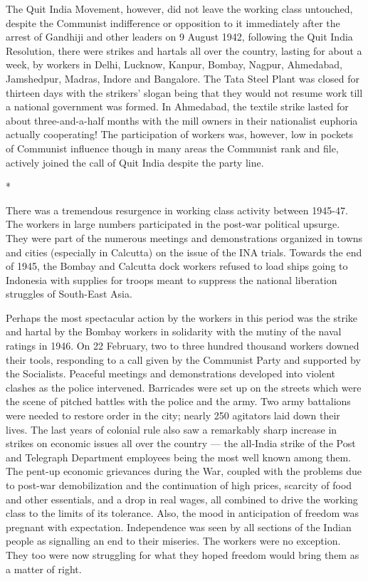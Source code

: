 The Quit India Movement, however, did not leave the working class untouched, despite the Communist indifference or opposition to it immediately after the arrest of Gandhiji and other leaders on 9 August 1942, following the Quit India Resolution, there were strikes and hartals all over the country, lasting for about a week, by workers in Delhi, Lucknow, Kanpur, Bombay, Nagpur, Ahmedabad, Jamshedpur, Madras, Indore and Bangalore. The Tata Steel Plant was closed for thirteen days with the strikers’ slogan being that they would not resume work till a national government was formed. In Ahmedabad, the textile strike lasted for about three-and-a-half months with the mill owners in their nationalist euphoria actually cooperating! The participation of workers was, however, low in pockets of Communist influence though in many areas the Communist rank and file, actively joined the call of Quit India despite the party line.

\begin{center}*\end{center}



There was a tremendous resurgence in working class activity between 1945-47. The workers in large numbers participated in the post-war political upsurge. They were part of the numerous meetings and demonstrations organized in towns and cities (especially in Calcutta) on the issue of the INA trials. Towards the end of 1945, the Bombay and Calcutta dock workers refused to load ships going to Indonesia with supplies for troops meant to suppress the national liberation struggles of South-East Asia.

Perhaps the most spectacular action by the workers in this period was the strike and hartal by the Bombay workers in solidarity with the mutiny of the naval ratings in 1946. On 22 February, two to three hundred thousand workers downed their tools, responding to a call given by the Communist Party and supported by the Socialists. Peaceful meetings and demonstrations developed into violent clashes as the police intervened. Barricades were set up on the streets which were the scene of pitched battles with the police and the army. Two army battalions were needed to restore order in the city; nearly 250 agitators laid down their lives. The last years of colonial rule also saw a remarkably sharp increase in strikes on economic issues all over the country — the all-India strike of the Post and Telegraph Department employees being the most well known among them. The pent-up economic grievances during the War, coupled with the problems due to post-war demobilization and the continuation of high prices, scarcity of food and other essentials, and a drop in real wages, all combined to drive the working class to the limits of its tolerance. Also, the mood in anticipation of freedom was pregnant with expectation. Independence was seen by all sections of the Indian people as signalling an end to their miseries. The workers were no exception. They too were now struggling for what they hoped freedom would bring them as a matter of right.
